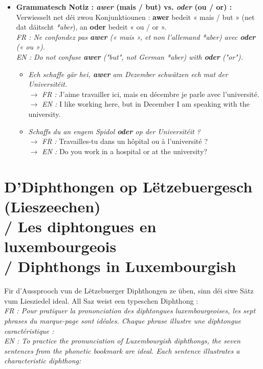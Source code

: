 \begin{itemize}
    \vspace{0.3em}

    \item \textbf{Grammatesch Notiz : \textit{awer} (mais / but) vs. \textit{oder} (ou / or) :} \\
    Verwiesselt net déi zwou Konjunktiounen : \textbf{awer} bedeit « mais / but » (net dat däitscht \textit{*aber}), an \textbf{oder} bedeit « ou / or ». \\
    \textit{FR : Ne confondez pas \textbf{awer} (« mais », et non l'allemand *aber) avec \textbf{oder} (« ou »).} \\
    \textit{EN : Do not confuse \textbf{awer} ("but", not German *aber) with \textbf{oder} ("or").}
    \begin{itemize}
        \item \textit{Ech schaffe gär hei, \textbf{awer} am Dezember schwätzen ech mat der Universitéit.} \\
        $\rightarrow$ \textit{FR :} J'aime travailler ici, mais en décembre je parle avec l'université. \\
        $\rightarrow$ \textit{EN :} I like working here, but in December I am speaking with the university.
        \item \textit{Schaffs du an engem Spidol \textbf{oder} op der Universitéit ?} \\
        $\rightarrow$ \textit{FR :} Travailles-tu dans un hôpital ou à l'université ? \\
        $\rightarrow$ \textit{EN :} Do you work in a hospital or at the university?
    \end{itemize}
\end{itemize}

\vspace{1.5em}

\section[D'Diphthongen op Lëtzebuergesch]{D'Diphthongen op Lëtzebuergesch (Lieszeechen) \\/ Les diphtongues en luxembourgeois \\/ Diphthongs in Luxembourgish}

Fir d'Aussprooch vun de Lëtzebuerger Diphthongen ze üben, sinn déi siwe Sätz vum Liesziedel ideal. All Saz weist een typeschen Diphthong : \\
\textit{FR : Pour pratiquer la prononciation des diphtongues luxembourgeoises, les sept phrases du marque-page sont idéales. Chaque phrase illustre une diphtongue caractéristique :} \\
\textit{EN : To practice the pronunciation of Luxembourgish diphthongs, the seven sentences from the phonetic bookmark are ideal. Each sentence illustrates a characteristic diphthong:}

